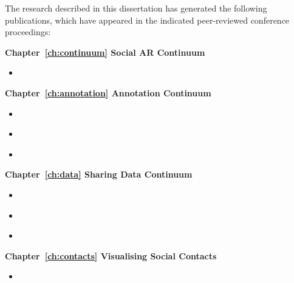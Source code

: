 \begin{preface}
\addchaptertocentry{\prefacename} %

The research described in this dissertation has generated the following publications, which have appeared in the indicated peer-reviewed conference proceedings:

\noindent
\textbf{Chapter~\ref{ch:continuum} Social AR Continuum}
\begin{itemize}
    \item{ }
\end{itemize}

\noindent
\textbf{Chapter~\ref{ch:annotation} Annotation Continuum}
\begin{itemize}
    \item{ }
    \item{ }
    \item{ }
\end{itemize}

\noindent
\textbf{Chapter~\ref{ch:data} Sharing Data Continuum}
\begin{itemize}
    \item{ }
    \item{ }
    \item{ }
\end{itemize}

\noindent
\textbf{Chapter~\ref{ch:contacts} Visualising Social Contacts}
\begin{itemize}
    \item{ }
\end{itemize}

\end{preface}